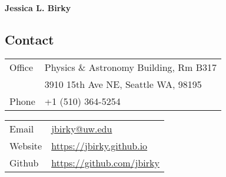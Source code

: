 \documentclass[margin,line]{resume}
\begin{document}
{\sc \textbf{\Large Jessica L. Birky}} 
\vspace{0.3cm}
\begin{resume}

 
\section{\mysidestyle \textcolor{bcolor}{Contact}}


\noindent\begin{multicols}{2}\small
\noindent\begin{tabular}{@{}l|l}
  \multirow{1}{*}{Office}   & Physics \& Astronomy Building, Rm B317  \\
  \multirow{1}{*}{}         & 3910 15th Ave NE, Seattle WA, 98195  \\
  \multirow{1}{*}{Phone}    & +1 (510) 364-5254 \\
\end{tabular}

\noindent\begin{tabular}{@{}l|l}
  \multirow{1}{*}{Email}    &   \href{jbirky@ucsd.edu}{jbirky@uw.edu} \\
  \multirow{1}{*}{Website}  &   \href{https://jbirky.github.io/}{https://jbirky.github.io} \\
  \multirow{1}{*}{Github}   &   \href{https://github.com/jbirky}{https://github.com/jbirky} \\
\end{tabular} 
\end{multicols}


\end{resume}
\end{document}
